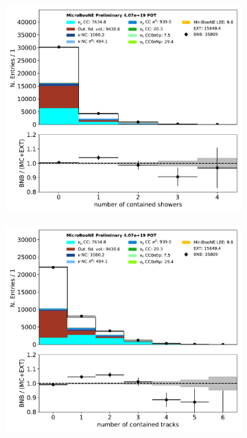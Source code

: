 \documentclass[a4paper]{article}
\begin{document}
\begin{figure}[H] 
\begin{center}
    \begin{subfigure}[b]{0.3\textwidth}
    \centering
    \includegraphics[width=1.00\textwidth]{nueselection/n_showers_contained_01132020_RUN1.pdf}
    \caption{\label{fig:nue:presel:nshower} }
    \end{subfigure}
    \begin{subfigure}[b]{0.3\textwidth}
    \centering
    \includegraphics[width=1.00\textwidth]{nueselection/n_tracks_contained_01132020_RUN1.pdf}

\end{subfigure}
\end{center}
\end{figure}
\end{document}
